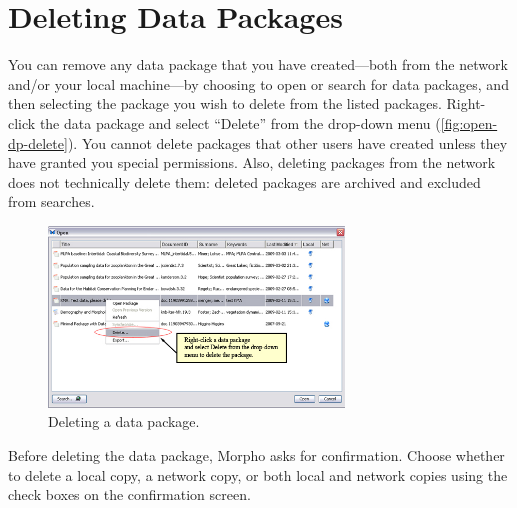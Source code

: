\section{Deleting Data Packages}

You can remove any data package that you have created—both from the
network and/or your local machine—by choosing to open or search for data
packages, and then selecting the package you wish to delete from the
listed packages. Right-click the data package and select ``Delete'' from
the drop-down menu (\autoref{fig:open-dp-delete}). You cannot delete
packages that other users have created unless they have granted you
special permissions. Also, deleting packages from the network does not
technically delete them: deleted packages are archived and excluded from
searches.

\begin{figure}
  \centering
    \includegraphics[width=0.7\textwidth]{images/open-dp-delete.jpg}
  \caption{Deleting a data package.}
  \label{fig:open-dp-delete}
\end{figure}

Before deleting the data package, Morpho asks for confirmation. Choose
whether to delete a local copy, a network copy, or both local and
network copies using the check boxes on the confirmation screen.
